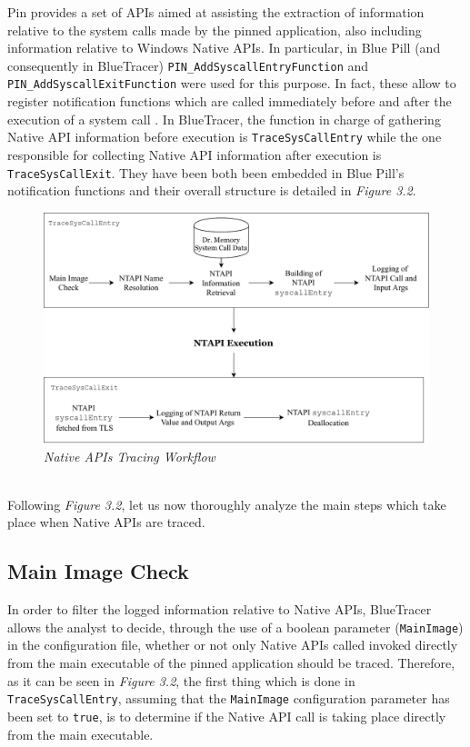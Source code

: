 \documentclass[binding=0.6cm,LaM,english,noexaminfo,oneside]{sapthesis} %
\begin{document}
Pin provides a set of APIs aimed at assisting the extraction of information relative to the system calls made by the pinned application, also including information relative to Windows Native APIs. In particular, in Blue Pill (and consequently in BlueTracer) \texttt{PIN\_AddSyscallEntryFunction} and  \texttt{PIN\_AddSyscallExitFunction} were used for this purpose. In fact, these allow to register notification functions which are called immediately before and after the execution of a system call \cite{Pin}. In BlueTracer, the function in charge of gathering Native API information before execution is \texttt{TraceSysCallEntry} while the one responsible for collecting Native API information after execution is \texttt{TraceSysCallExit}. They have been both been embedded in Blue Pill's notification functions and their overall structure is detailed in \textit{Figure 3.2}.
\\
\begin{figure}[h]
\centering
\includegraphics[scale=0.75]{Figures/NTAPITracing.pdf}
\caption{\textit{Native APIs Tracing Workflow}}
\end{figure}
\\
Following \textit{Figure 3.2}, let us now thoroughly analyze the main steps which take place when Native APIs are traced.

\subsection{Main Image Check}
In order to filter the logged information relative to Native APIs, BlueTracer allows the analyst to decide, through the use of a boolean parameter (\texttt{MainImage}) in the configuration file, whether or not only Native APIs called invoked directly from the main executable of the pinned application should be traced. Therefore, as it can be seen in \textit{Figure 3.2}, the first thing which is done in \texttt{TraceSysCallEntry}, assuming that the \texttt{MainImage} configuration parameter has been set to \texttt{true}, is to determine if the Native API call is taking place directly from the main executable.
\end{document}

